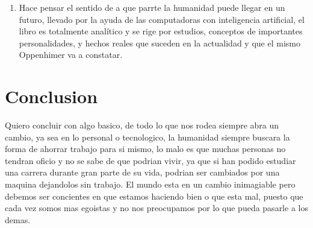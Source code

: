 \documentclass{article}
\begin{document}
\begin{multicols}{2}
\begin{enumerate}
\item  Hace pensar el sentido de a que parrte la humanidad puede llegar en un futuro, llevado por la ayuda de las computadoras con inteligencia artificial, el libro es totalmente analítico y se rige por estudios, conceptos de importantes personalidades,  y hechos reales que suceden en la actualidad y que el mismo Oppenhimer va a constatar.
\end{enumerate}


\section{Conclusion}
Quiero concluir con algo basico, de todo lo que nos rodea siempre abra un cambio, ya sea en lo personal o tecnologico, la humanidad siempre buscara la forma de ahorrar trabajo para si mismo, lo malo es que muchas personas no tendran oficio y no se sabe de que podrian vivir, ya que si han podido estudiar una carrera durante gran parte de su vida, podrian ser cambiados por una maquina dejandolos sin trabajo. El mundo esta en un cambio inimagiable pero debemos ser concientes en que estamos haciendo bien o que esta mal, puesto que cada vez somos mas egoistas y no nos preocupamos por lo que pueda pasarle a los demas.




\end{multicols}
\end{document}
